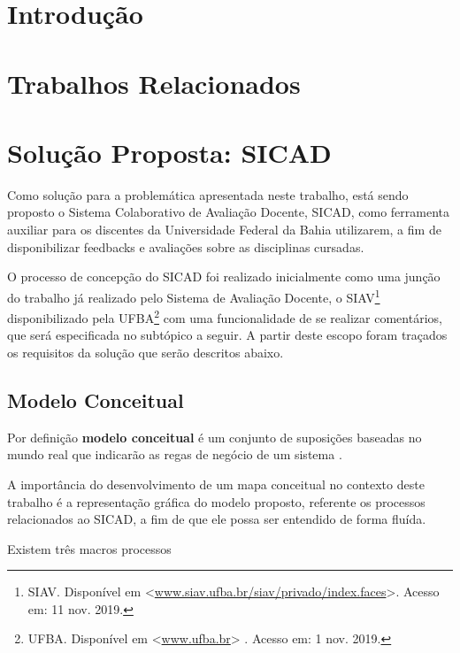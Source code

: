 \documentclass[12pt, a4paper]{report}
\begin{document}
\listoffigures
\cleardoublepage


\listoftables
\cleardoublepage

\chapter{Introdução}

\chapter {Trabalhos Relacionados}

\chapter{Solução Proposta: SICAD}
\par Como solução para a problemática apresentada neste trabalho, está sendo proposto o Sistema Colaborativo de Avaliação Docente, SICAD, como ferramenta auxiliar para os discentes da Universidade Federal da Bahia utilizarem, a fim de disponibilizar feedbacks e avaliações sobre as disciplinas cursadas. 
\par O processo de concepção do SICAD foi realizado inicialmente como uma junção do trabalho já realizado pelo Sistema de Avaliação Docente, o SIAV\footnote{SIAV. Disponível em <\url{www.siav.ufba.br/siav/privado/index.faces}>. Acesso em: 11 nov. 2019.} disponibilizado pela UFBA\footnote{UFBA. Disponível em <\url{www.ufba.br}> . Acesso em: 1 nov. 2019.} com uma funcionalidade de se realizar comentários, que será especificada no subtópico a seguir. A partir deste escopo foram traçados os requisitos da solução que serão descritos abaixo.

\section{ Modelo Conceitual}
\par 
Por definição \textbf{modelo conceitual} é um conjunto de suposições baseadas no mundo real que indicarão as regas de negócio de um sistema \cite{mapaconceitual}.
\par A importância do desenvolvimento de um mapa conceitual no contexto deste trabalho é a representação gráfica do modelo proposto, referente os processos relacionados ao SICAD, a fim de que ele possa ser entendido de forma fluída.
\par Existem três macros processos   
\end{document}

